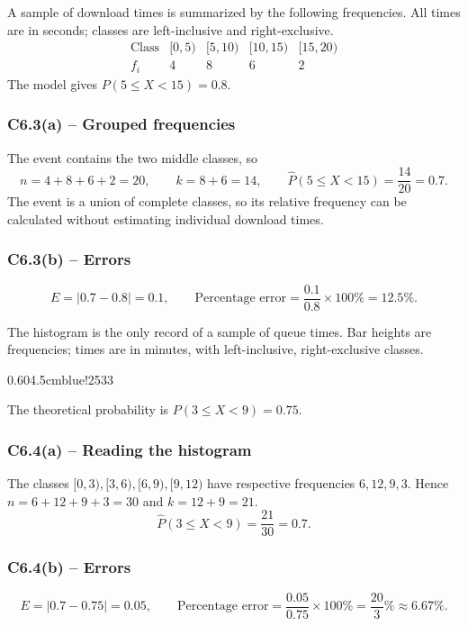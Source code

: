 {
A sample of download times is summarized by the following frequencies.
All times are in seconds; classes are left-inclusive and right-exclusive.
\[
\begin{array}{c|rrrr}
\text{Class}&[0,5)&[5,10)&[10,15)&[15,20)\\\hline
f_i&4&8&6&2
\end{array}
\]
The model gives $P(5\le X<15)=0.8$.
\label{sol:c6-3a}
\subsubsection*{C6.3(a) -- Grouped frequencies }
The event contains the two middle classes, so
\[
n=4+8+6+2=20,\qquad k=8+6=14,\qquad
\widehat P(5\le X<15)=\frac{14}{20}=0.7.
\]
The event is a union of complete classes, so its relative frequency can
be calculated without estimating individual download times.
\label{sol:c6-3b}
\subsubsection*{C6.3(b) -- Errors }
\[
E=|0.7-0.8|=0.1,\qquad
\text{Percentage error}=\frac{0.1}{0.8}\times100\%=12.5\%.
\]
\secInicio[sec:c6-3]
}

{
The histogram is the only record of a sample of queue times. Bar heights
are frequencies; times are in minutes, with left-inclusive, right-exclusive classes.
\begin{center}
{0.60\textwidth}{4.5cm}{blue!25}{3}{3}
\end{center}
The theoretical probability is $P(3\le X<9)=0.75$.
\label{sol:c6-4a}
\subsubsection*{C6.4(a) -- Reading the histogram }
The classes $[0,3),[3,6),[6,9),[9,12)$ have respective frequencies
$6,12,9,3$. Hence $n=6+12+9+3=30$ and $k=12+9=21$.
\[
\widehat P(3\le X<9)=\frac{21}{30}=0.7.
\]
\label{sol:c6-4b}
\subsubsection*{C6.4(b) -- Errors }
\[
E=|0.7-0.75|=0.05,\qquad
\text{Percentage error}=\frac{0.05}{0.75}\times100\%
=\frac{20}{3}\%\approx6.67\%.
\]
\secInicio[sec:c6-4]
}

